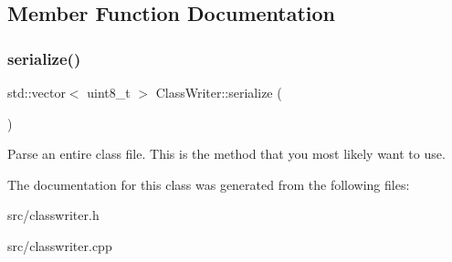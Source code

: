 \subsection{Member Function Documentation}
\mbox{\label{classClassWriter_a7be4d13b5665b1e85a8a350ec181951c}} 
\subsubsection{\texorpdfstring{serialize()}{serialize()}}
{\footnotesize\ttfamily std\+::vector$<$ uint8\+\_\+t $>$ Class\+Writer\+::serialize (\begin{DoxyParamCaption}{ }\end{DoxyParamCaption})}

Parse an entire class file. This is the method that you most likely want to use. 

The documentation for this class was generated from the following files\+:\begin{DoxyCompactItemize}
\item 
src/classwriter.\+h\item 
src/classwriter.\+cpp\end{DoxyCompactItemize}
